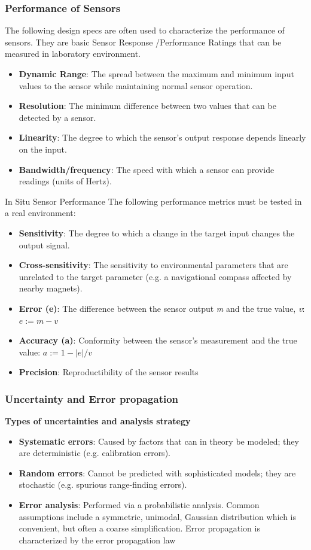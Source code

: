 \subsubsection{Performance of Sensors}


The following design specs are often used to characterize the performance of sensors. They are basic Sensor Response /Performance Ratings that can be measured in laboratory environment.
\begin{itemize}
  \item \textbf{Dynamic Range}: The spread between the maximum and minimum input values to the sensor while maintaining normal sensor operation.
  \item \textbf{Resolution}: The minimum difference between two values that can be detected by a sensor.
  \item \textbf{Linearity}: The degree to which the sensor's output response depends linearly on the input.
 \item \textbf{Bandwidth/frequency}: The speed with which a sensor can provide readings (units of Hertz).
\end{itemize}

In Situ Sensor Performance 
The following performance metrics must be tested in a real environment:
\begin{itemize}
  \item \textbf{Sensitivity}: The degree to which a change in the target input changes the output signal.
  \item \textbf{Cross-sensitivity}: The sensitivity to environmental parameters that are unrelated to the target parameter (e.g. a navigational compass affected by nearby magnets).
  \item \textbf{Error (e)}: The difference between the sensor output \textit{m} and the true value, \textit{v}: $e:=m-v$
 \item \textbf{Accuracy (a)}: Conformity between the sensor's measurement and the true value: $a:=1-|e|/v$
 \item \textbf{Precision}: Reproductibility of the sensor results
\end{itemize}

\subsubsection{Uncertainty and Error propagation}
\textbf{Types of uncertainties and analysis strategy}
\begin{itemize}
    \item \textbf{Systematic errors}: Caused by factors that can in theory be modeled; they are deterministic (e.g. calibration errors).
    \item \textbf{Random errors}: Cannot be predicted with sophisticated models; they are stochastic (e.g. spurious range-finding errors).
    \item \textbf{Error analysis}: Performed via a probabilistic analysis. Common assumptions include a symmetric, unimodal, Gaussian distribution which is convenient, but often a coarse simplification. Error propagation is characterized by the error propagation law
\end{itemize}

